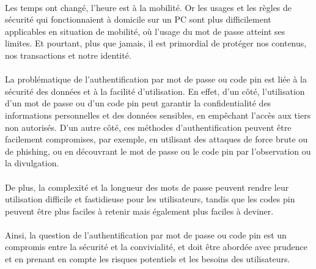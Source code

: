\introduction

\paragraph{}Les temps ont changé, l’heure est à la mobilité. Or les usages et les règles de sécurité qui fonctionnaient à domicile sur un PC sont plus difficilement applicables en situation de mobilité, où l’usage du mot de passe atteint ses limites. Et pourtant, plus que jamais, il est primordial de protéger nos contenus, nos transactions et notre identité.
\paragraph{}La problématique de l'authentification par mot de passe ou code pin est liée à la sécurité des données et à la facilité d'utilisation. En effet, d'un côté, l'utilisation d'un mot de passe ou d'un code pin peut garantir la confidentialité des informations personnelles et des données sensibles, en empêchant l'accès aux tiers non autorisés. D'un autre côté, ces méthodes d'authentification peuvent être facilement compromises, par exemple, en utilisant des attaques de force brute ou de phishing, ou en découvrant le mot de passe ou le code pin par l'observation ou la divulgation.
\paragraph{}De plus, la complexité et la longueur des mots de passe peuvent rendre leur utilisation difficile et fastidieuse pour les utilisateurs, tandis que les codes pin peuvent être plus faciles à retenir mais également plus faciles à deviner.
\paragraph{}Ainsi, la question de l'authentification par mot de passe ou code pin est un compromis entre la sécurité et la convivialité, et doit être abordée avec prudence et en prenant en compte les risques potentiels et les besoins des utilisateurs. 
